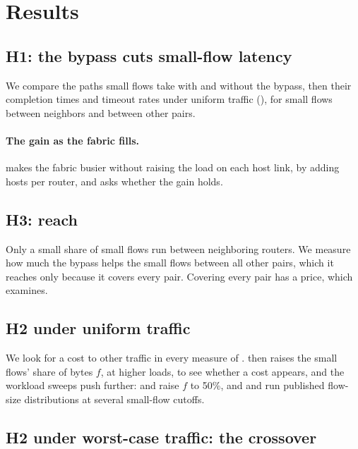 \section{Results}
\label{sec:results}

\subsection{H1: the bypass cuts small-flow latency}
\label{sec:h1}

We compare the paths small flows take with and without the bypass, then their completion times and timeout rates under uniform traffic (), for small flows between neighbors and between other pairs.

\paragraph{The gain as the fabric fills.}  makes the fabric busier without raising the load on each host link, by adding hosts per router, and asks whether the gain holds.

\subsection{H3: reach}
\label{sec:h3}

Only a small share of small flows run between neighboring routers. We measure how much the bypass helps the small flows between all other pairs, which it reaches only because it covers every pair. Covering every pair has a price, which  examines.

\subsection{H2 under uniform traffic}
\label{sec:h2-uniform}

We look for a cost to other traffic in every measure of .  then raises the small flows' share of bytes $f$, at higher loads, to see whether a cost appears, and the workload sweeps push further:  and  raise $f$ to 50\%, and  and  run published flow-size distributions at several small-flow cutoffs.

\subsection{H2 under worst-case traffic: the crossover}
\label{sec:h2-perm}

